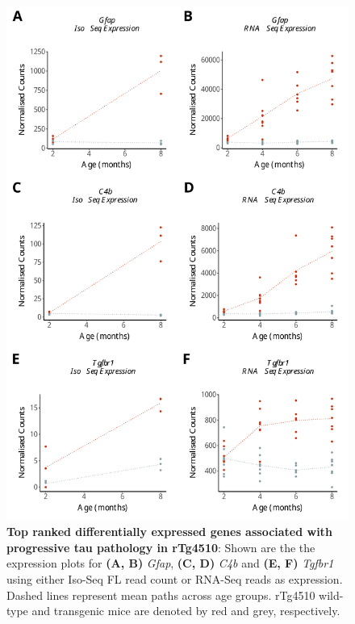 \begin{figure}[h]
	\begin{center}
		\includegraphics[page=1,scale = 0.55]{Figures/WholeDifferentialAnalysis.pdf}
	\end{center}
	\captionsetup{width=0.95\textwidth}
	\caption[Top ranked differentially expressed genes associated with progressive tau pathology in rTg4510]%
	{\textbf{Top ranked differentially expressed genes associated with progressive tau pathology in rTg4510}: Shown are the the expression plots for \textbf{(A, B)} \textit{Gfap}, \textbf{(C, D)} \textit{C4b} and \textbf{(E, F)} \textit{Tgfbr1} using either Iso-Seq FL read count or RNA-Seq reads as expression. Dashed lines represent mean paths across age groups. rTg4510 wild-type and transgenic mice are denoted by red and grey, respectively.}   
	\label{fig:whole_dea}
\end{figure}

